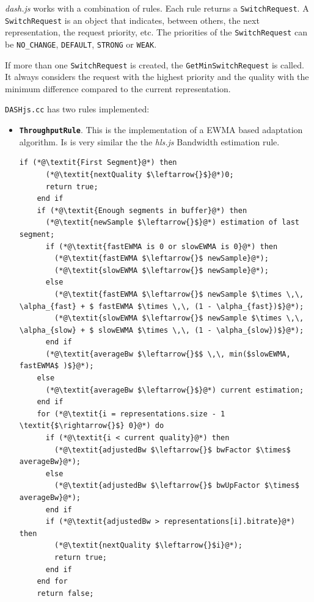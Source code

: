 \textit{dash.js} works with a combination of rules. Each rule returns a \texttt{SwitchRequest}.
A \texttt{SwitchRequest} is an object that indicates, between others, the next representation, the 
request priority, etc. The priorities of the \texttt{SwitchRequest} can be \texttt{NO\_CHANGE}, 
\texttt{DEFAULT}, \texttt{STRONG} or \texttt{WEAK}.

If more than one \texttt{SwitchRequest} is created, the \texttt{GetMinSwitchRequest} is called.
It always considers the request with the highest priority and the quality with the minimum difference compared to the
current representation.

\texttt{DASHjs.cc} has two rules implemented:

\begin{itemize}
  \item \textbf{\texttt{ThroughputRule}}. This is the implementation of a EWMA based adaptation
  algorithm. Is is very similar the the \textit{hls.js} Bandwidth estimation rule.
  

\begin{minipage}{\linewidth}

  \begin{lstlisting}[language=myalgo, caption={HLSjs.cc Bandwidth Rule}, label={lst:hls},captionpos=b]
    if (*@\textit{First Segment}@*) then
      (*@\textit{nextQuality $\leftarrow{}$}@*)0;
      return true;
    end if
    if (*@\textit{Enough segments in buffer}@*) then
      (*@\textit{newSample $\leftarrow{}$}@*) estimation of last segment;
      if (*@\textit{fastEWMA is 0 or slowEWMA is 0}@*) then
        (*@\textit{fastEWMA $\leftarrow{}$ newSample}@*);
        (*@\textit{slowEWMA $\leftarrow{}$ newSample}@*);
      else 
        (*@\textit{fastEWMA $\leftarrow{}$ newSample $\times \,\, \alpha_{fast} + $ fastEWMA $\times \,\, (1 - \alpha_{fast})$}@*);
        (*@\textit{slowEWMA $\leftarrow{}$ newSample $\times \,\, \alpha_{slow} + $ slowEWMA $\times \,\, (1 - \alpha_{slow})$}@*);
      end if
      (*@\textit{averageBw $\leftarrow{}$$ \,\, min($slowEWMA, fastEWMA$ )$}@*);
    else
      (*@\textit{averageBw $\leftarrow{}$}@*) current estimation;
    end if
    for (*@\textit{i = representations.size - 1 \textit{$\rightarrow{}$} 0}@*) do
      if (*@\textit{i < current quality}@*) then
        (*@\textit{adjustedBw $\leftarrow{}$ bwFactor $\times$ averageBw}@*);
      else 
        (*@\textit{adjustedBw $\leftarrow{}$ bwUpFactor $\times$ averageBw}@*);
      end if
      if (*@\textit{adjustedBw > representations[i].bitrate}@*) then
        (*@\textit{nextQuality $\leftarrow{}$i}@*);
        return true;
      end if
    end for
    return false;
  \end{lstlisting}
  \end{minipage}
  

\end{itemize}
